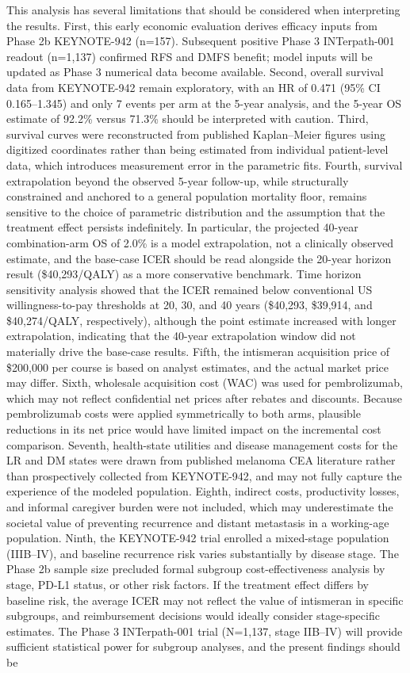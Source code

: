 \documentclass[12pt,a4paper]{article}
\begin{document}
This analysis has several limitations that should be considered when interpreting the results. First, this early economic evaluation derives efficacy inputs from Phase 2b \mbox{KEYNOTE-942} (n=157). Subsequent positive Phase 3 \mbox{INTerpath-001} readout (n=1,137) confirmed RFS and DMFS benefit; model inputs will be updated as Phase 3 numerical data become available. Second, overall survival data from \mbox{KEYNOTE-942} remain exploratory, with an HR of 0.471 (95\% CI 0.165--1.345) and only 7 events per arm at the 5-year analysis, and the 5-year OS estimate of 92.2\% versus 71.3\% should be interpreted with caution. Third, survival curves were reconstructed from published Kaplan--Meier figures using digitized coordinates rather than being estimated from individual patient-level data, which introduces measurement error in the parametric fits. Fourth, survival extrapolation beyond the observed 5-year follow-up, while structurally constrained and anchored to a general population mortality floor, remains sensitive to the choice of parametric distribution and the assumption that the treatment effect persists indefinitely. In particular, the projected 40-year combination-arm OS of 2.0\% is a model extrapolation, not a clinically observed estimate, and the base-case ICER should be read alongside the 20-year horizon result (\$40,293/QALY) as a more conservative benchmark. Time horizon sensitivity analysis showed that the ICER remained below conventional US willingness-to-pay thresholds at 20, 30, and 40 years (\$40,293, \$39,914, and \$40,274/QALY, respectively), although the point estimate increased with longer extrapolation, indicating that the 40-year extrapolation window did not materially drive the base-case results. Fifth, the intismeran acquisition price of \$200,000 per course is based on analyst estimates, and the actual market price may differ. Sixth, wholesale acquisition cost (WAC) was used for \mbox{pembrolizumab}, which may not reflect confidential net prices after rebates and discounts. Because \mbox{pembrolizumab} costs were applied symmetrically to both arms, plausible reductions in its net price would have limited impact on the incremental cost comparison. Seventh, health-state utilities and disease management costs for the LR and DM states were drawn from published melanoma CEA literature rather than prospectively collected from \mbox{KEYNOTE-942}, and may not fully capture the experience of the modeled population. Eighth, indirect costs, productivity losses, and informal caregiver burden were not included, which may underestimate the societal value of preventing recurrence and distant metastasis in a working-age population. Ninth, the \mbox{KEYNOTE-942} trial enrolled a mixed-stage population (IIIB--IV), and baseline recurrence risk varies substantially by disease stage. The Phase 2b sample size precluded formal subgroup cost-effectiveness analysis by stage, PD-L1 status, or other risk factors. If the treatment effect differs by baseline risk, the average ICER may not reflect the value of intismeran in specific subgroups, and reimbursement decisions would ideally consider stage-specific estimates. The Phase 3 \mbox{INTerpath-001} trial (N=1,137, stage IIB--IV) will provide sufficient statistical power for subgroup analyses, and the present findings should be 
\end{document}
